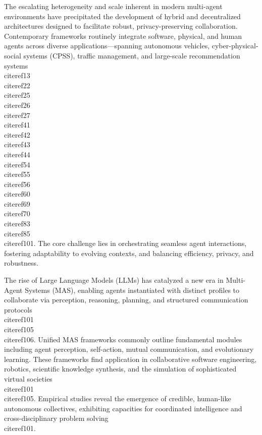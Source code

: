 \documentclass[11pt]{article}
\begin{document}
The escalating heterogeneity and scale inherent in modern multi-agent environments have precipitated the development of hybrid and decentralized architectures designed to facilitate robust, privacy-preserving collaboration. Contemporary frameworks routinely integrate software, physical, and human agents across diverse applications—spanning autonomous vehicles, cyber-physical-social systems (CPSS), traffic management, and large-scale recommendation systems~\\cite{ref13}\\cite{ref22}\\cite{ref25}\\cite{ref26}\\cite{ref27}\\cite{ref41}\\cite{ref42}\\cite{ref43}\\cite{ref44}\\cite{ref54}\\cite{ref55}\\cite{ref56}\\cite{ref60}\\cite{ref69}\\cite{ref70}\\cite{ref83}\\cite{ref85}\\cite{ref101}. The core challenge lies in orchestrating seamless agent interactions, fostering adaptability to evolving contexts, and balancing efficiency, privacy, and robustness.

The rise of Large Language Models (LLMs) has catalyzed a new era in Multi-Agent Systems (MAS), enabling agents instantiated with distinct profiles to collaborate via perception, reasoning, planning, and structured communication protocols~\\cite{ref101}\\cite{ref105}\\cite{ref106}. Unified MAS frameworks commonly outline fundamental modules including agent perception, self-action, mutual communication, and evolutionary learning. These frameworks find application in collaborative software engineering, robotics, scientific knowledge synthesis, and the simulation of sophisticated virtual societies~\\cite{ref101}\\cite{ref105}. Empirical studies reveal the emergence of credible, human-like autonomous collectives, exhibiting capacities for coordinated intelligence and cross-disciplinary problem solving~\\cite{ref101}.
\end{document}
